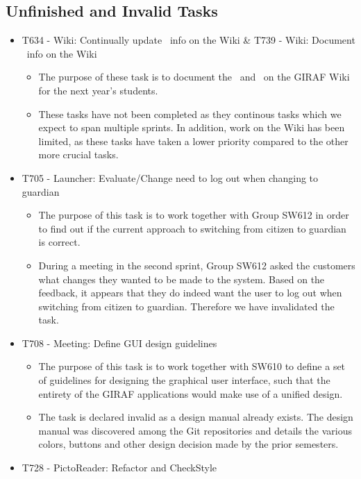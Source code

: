 \subsection{Unfinished and Invalid Tasks}\label{S2Invalid}
\begin{itemize}
  \item T634 - Wiki: Continually update \lapp\ info on the Wiki \& T739 -
  Wiki: Document \plib\ info on the Wiki
  \begin{itemize}
  	\item The purpose of these task is to document the \lapp\ and \plib\
  	on the GIRAF Wiki for the next year's students. 
  	\item These tasks have not been completed as they continous tasks which we
  	expect to span multiple sprints. In addition, work on the Wiki has been
  	limited, as these tasks have taken a lower priority compared to
  	the other more crucial tasks.
  \end{itemize}
  \item T705 - Launcher: Evaluate/Change need to log out when changing  to
  guardian
  \begin{itemize}
  	\item The purpose of this task is to work together with Group SW612 in order
  	to find out if the current approach to switching from citizen to
  	guardian is correct. 
  	\item During a meeting in the second sprint, Group SW612 asked the customers
  	what changes they wanted to be made to the system. Based on the feedback, it
  	appears that they do indeed want the user to log out when switching from
  	citizen to guardian. Therefore we have invalidated the task.
  \end{itemize}
  \item T708 - Meeting: Define GUI design guidelines
  \begin{itemize}
    \item The purpose of this task is to work together with SW610 to define a
    set of guidelines for designing the graphical user interface, such that the
    entirety of the GIRAF applications would make use of a unified design.
    \item The task is declared invalid as a design manual already exists. The
    design manual was discovered among the Git repositories and details the
    various colors, buttons and other design decision made by the prior
    semesters.  
  \end{itemize}
  \item T728 - PictoReader: Refactor and CheckStyle

\end{itemize}
